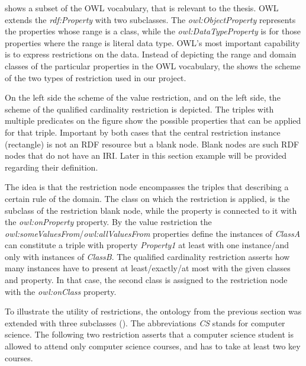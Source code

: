  shows a subset of the OWL vocabulary, that is relevant to the thesis. OWL extends the \textit{rdf:Property} with two subclasses. The \textit{owl:ObjectProperty} represents the properties whose range is a class, while the \textit{owl:DataTypeProperty} is for those properties where the range is literal data type. OWL's most important capability is to express restrictions on the data. Instead of depicting the range and domain classes of the particular properties in the OWL vocabulary, the  shows the scheme of the two types of restriction used in our project.



On the left side the scheme of the value restriction, and on the left side, the scheme of the qualified cardinality restriction is depicted. The triples with multiple predicates on the figure show the possible properties that can be applied for that triple. Important by both cases that the central restriction instance (rectangle) is not an RDF resource but a blank node. Blank nodes are such RDF nodes that do not have an IRI. Later in this section example will be provided regarding their definition.

The idea is that the restriction node encompasses the triples that describing a certain rule of the domain. The class on which the restriction is applied, is the subclass of the restriction blank node, while the property is connected to it with the \textit{owl:onProperty} property. By the value restriction the \textit{owl:someValuesFrom}/\textit{owl:allValuesFrom} properties define the instances of \textit{ClassA} can constitute a triple with property \textit{Property1} at least with one instance/and only with instances of \textit{ClassB}. The qualified cardinality restriction asserts how many instances have to present at least/exactly/at most with the given classes and property. In that case, the second class is assigned to the restriction node with the \textit{owl:onClass} property.


To illustrate the utility of restrictions, the ontology from the previous section was extended with three subclasses (). The abbreviations \textit{CS} stands for computer science. The following two restriction asserts that a computer science student is allowed to attend only computer science courses, and has to take at least two key courses.

